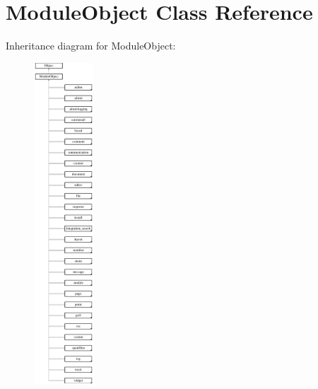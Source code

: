 \hypertarget{classModuleObject}{\section{Module\+Object Class Reference}
\label{classModuleObject}
}
Inheritance diagram for Module\+Object\+:\begin{figure}[H]
\begin{center}
\leavevmode
\includegraphics[height=12.000000cm]{classModuleObject}
\end{center}
\end{figure}
